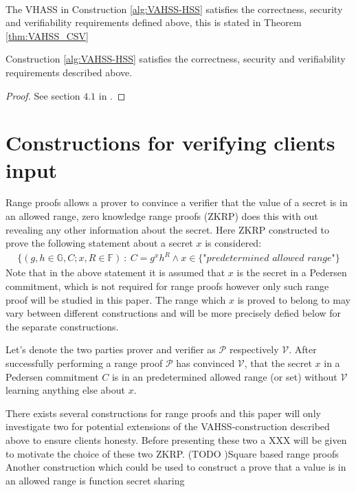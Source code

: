 \\
The VHASS in Construction \ref{alg:VAHSS-HSS} satisfies the correctness, security and verifiability requirements defined above, this is stated in Theorem \ref{thm:VAHSS_CSV} 
\\
\begin{thm}
\label{thm:VAHSS_CSV}
Construction \ref{alg:VAHSS-HSS} satisfies the correctness, security and verifiability requirements described above.
\end{thm}
\begin{proof}
See section $4.1$ in \cite{VAHSS}.
\end{proof}





\section{Constructions for verifying clients input}
\label{sec:RF_theory}
Range proofs allows a prover to convince a verifier that the value of a secret is in an allowed range, zero knowledge range proofs (ZKRP) does this with out revealing any other information about the secret. Here ZKRP constructed to prove the following statement about a secret $x$ is considered:
\begin{align}
\label{eq:RP_statement}
    \{(g,h\in\mathds{G},C;x,R\in\mathds{F})\::\:C= g^x h^R \wedge x \in \{\textit{"predetermined allowed range"}\}
\end{align}
Note that in the above statement  it is assumed that $x$ is the secret in a Pedersen commitment, which is not required for range proofs however only such range proof will be studied in this paper. The range which $x$ is proved to belong to may vary between different constructions and will be more precisely defied below for the separate constructions. 

Let's denote the two parties prover and verifier as  $\mathcal{P}$ respectively $\mathcal{V}$. After successfully performing a range proof  $\mathcal{P}$ has convinced $\mathcal{V}$, that the secret $x$ in a Pedersen commitment $C$ is in an predetermined allowed range (or set) without $\mathcal{V}$ learning anything else about $x$.

There exists several constructions for range proofs and this paper will only investigate two for potential extensions of the VAHSS-construction described above to ensure clients honesty. Before presenting these two a XXX will be given to motivate the choice of these two ZKRP. (TODO )Square based range proofs \cite{Efficient_proof_interval} %
Another construction which could be used to construct a prove that a value is in an allowed range is function secret sharing \cite{FSS} %

